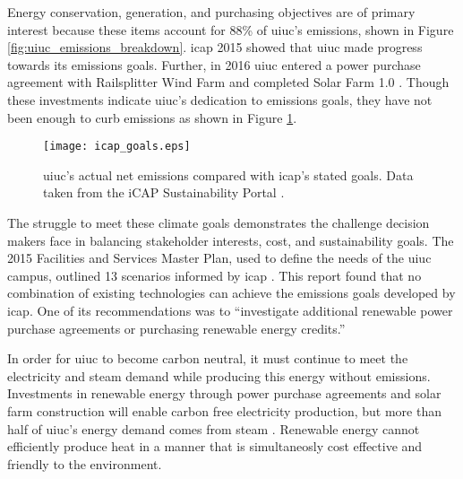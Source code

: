 Energy conservation, generation, and purchasing objectives are of primary
interest because these items account for 88\% of \gls{uiuc}'s emissions, shown
in Figure \ref{fig:uiuc_emissions_breakdown}. \gls{icap} 2015 showed that
\gls{uiuc} made progress towards its emissions goals. Further, in 2016
\gls{uiuc} entered a power purchase agreement with Railsplitter Wind Farm
\cite{breitweiser_wind_2016} and completed Solar Farm 1.0
\cite{white_solar_2017}. Though these investments indicate \gls{uiuc}'s dedication to
emissions goals, they have not been enough to curb emissions as shown in Figure
\ref{fig:uiuc_ghg}.


\begin{figure}[h]
  \centering
  \texttt{[image: icap\_goals.eps]}
  \caption{\gls{uiuc}'s actual net emissions compared with \gls{icap}'s
  stated goals. Data taken from the iCAP Sustainability Portal
  \cite{noauthor_metric_nodate}.}
    \label{fig:uiuc_ghg}
\end{figure}

The struggle to meet these climate goals demonstrates the challenge decision
makers face in balancing stakeholder interests, cost, and sustainability goals.
The 2015 Facilities and Services Master Plan, used to define the needs of the
\gls{uiuc} campus, outlined 13 scenarios informed by \gls{icap}
\cite{affiliated_engineers_inc_utilities_2015}. This report found that no
combination of existing technologies can achieve the emissions goals developed
by \gls{icap}. One of its recommendations was to ``investigate additional
renewable power purchase agreements or purchasing renewable energy credits.''

In order for \gls{uiuc} to become carbon neutral, it must continue to meet the
electricity and steam demand while producing this energy without emissions.
Investments in renewable energy through power purchase agreements and solar
farm construction will enable carbon free electricity production, but more than
half of \gls{uiuc}'s energy demand comes from steam \cite{isee_illinois_2015}
. Renewable energy cannot
efficiently produce heat in a manner that is simultaneosly cost effective and
friendly to the environment.


